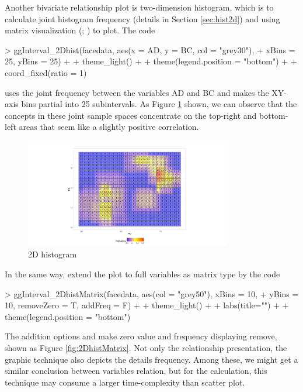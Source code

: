 \documentclass[article]{jss}
\begin{document}
Another bivariate relationship plot is two-dimension histogram, which is to calculate joint histogram frequency (details in Section \ref{sec:hist2d}) and using matrix visualization (\cite{chen2002generalized}; \cite{chen2004matrix}) to plot. The code

\begin{Schunk}
\begin{Sinput}
> ggInterval_2Dhist(facedata, aes(x = AD, y = BC, col = "grey30"),
+                   xBins = 25, yBins = 25) + 
+   theme_light() +
+   theme(legend.position = "bottom") + 
+   coord_fixed(ratio = 1)
\end{Sinput}
\end{Schunk}


uses the joint frequency between the variables AD and BC and makes the XY-axis bins partial into 25 subintervals. As Figure \ref{fig:2Dhist} shown, we can observe that the concepts in these joint sample spaces concentrate on the top-right and bottom-left areas that seem like a slightly positive correlation.

\begin{figure}[htbp]
\centering
\includegraphics[width=0.8\textwidth]{ggESDA_Jiang&Wu_20210915-2Dhist.pdf
}
\caption{\label{fig:2Dhist} 2D histogram }
\end{figure}

In the same way, extend the plot to full variables as matrix type by the code

\begin{Schunk}
\begin{Sinput}
> ggInterval_2DhistMatrix(facedata, aes(col = "grey50"), xBins = 10,
+                         yBins = 10, removeZero = T, addFreq = F) + 
+   theme_light() + 
+   labs(title="") +
+   theme(legend.position = "bottom")
\end{Sinput}
\end{Schunk}

The addition options  and  make zero value and frequency displaying remove, shown as Figure \ref{fig:2DhistMatrix}. Not only the relationship presentation, the graphic technique also depicts the details frequency. Among these, we might get a similar conclusion between variables relation, but for the calculation, this technique may consume a larger time-complexity than scatter plot.
\end{document}
